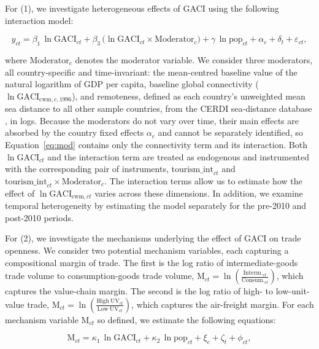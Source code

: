 For (1), we investigate heterogeneous effects of GACI using the following interaction model:

\begin{equation}
y_{ct} = \beta_1\,\ln\mathrm{GACI}_{ct}
+\beta_3\,\bigl(\ln\mathrm{GACI}_{ct} \times \mathrm{Moderator}_{c}\bigr)
+ \gamma\,\ln\mathrm{pop}_{ct}
+ \alpha_c + \delta_t + \varepsilon_{ct},
\label{eq:mod}
\end{equation}

where $\mathrm{Moderator}_{c}$ denotes the moderator variable. We consider three moderators, all country-specific and time-invariant: the mean-centred baseline value of the natural logarithm of GDP per capita, baseline global connectivity ($\ln\mathrm{GACI}_{\mathrm{cwm},c,1996}$), and remoteness, defined as each country's unweighted mean sea distance to all other sample countries, from the CERDI sea-distance database \citep{Bertoli_2016}, in logs. Because the moderators do not vary over time, their main effects are absorbed by the country fixed effects $\alpha_c$ and cannot be separately identified, so Equation~\eqref{eq:mod} contains only the connectivity term and its interaction. Both $\ln\mathrm{GACI}_{ct}$ and the interaction term are treated as endogenous and instrumented with the corresponding pair of instruments, $\text{tourism\_int}_{ct}$ and $\text{tourism\_int}_{ct}\times\mathrm{Moderator}_{c}$. The interaction terms allow us to estimate how the effect of $\ln\mathrm{GACI}_{\mathrm{cwm},ct}$ varies across these dimensions. In addition, we examine temporal heterogeneity by estimating the model separately for the pre-2010 and post-2010 periods.

For (2), we investigate the mechanisms underlying the effect of GACI on trade openness. We consider two potential mechanism variables, each capturing a compositional margin of trade. The first is the log ratio of intermediate-goods trade volume to consumption-goods trade volume,
$\mathrm{M}_{ct} = \ln \left( \frac{\mathrm{Interm.}_{ct}}{\mathrm{Consum.}_{ct}} \right)$,
which captures the value-chain margin. The second is the log ratio of high- to low-unit-value trade,
$\mathrm{M}_{ct} = \ln \left( \frac{\mathrm{High\ UV}_{ct}}{\mathrm{Low\ UV}_{ct}} \right)$,
which captures the air-freight margin. For each mechanism variable $\mathrm{M}_{ct}$ so defined, we estimate the following equations:

\begin{equation}
\mathrm{M}_{ct}
= \kappa_1\,\ln\mathrm{GACI}_{ct}
+ \kappa_2\,\ln\mathrm{pop}_{ct}
+ \xi_c + \zeta_t + \phi_{ct},
\label{eq:mec1}
\end{equation}

